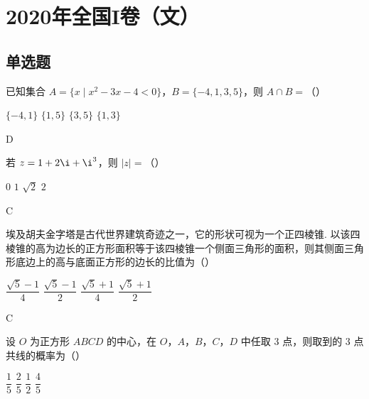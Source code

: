 \chapter{2020年全国I卷（文）}

\section{单选题}

\begin{problem}
已知集合 \(A=\{x\mid x^2-3x-4<0\}\)，\(B=\{-4,1,3,5\}\)，则 \(A\cap B=\)（\quad）

\choices
    {\(\{-4,1\}\)}
    {\(\{1,5\}\)}
    {\(\{3,5\}\)}
    {\(\{1,3\}\)}
\end{problem}

\begin{answer}
D
\end{answer}

\begin{problem}
若 \(z=1+2\i+\i^3\)，则 \(\lvert z\rvert=\)（\quad）

\choices
    {\(0\)}
    {\(1\)}
    {\(\sqrt{2}\)}
    {\(2\)}
\end{problem}

\begin{answer}
C
\end{answer}

\begin{problem}
埃及胡夫金字塔是古代世界建筑奇迹之一，它的形状可视为一个正四棱锥. 以该四棱锥的高为边长的正方形面积等于该四棱锥一个侧面三角形的面积，则其侧面三角形底边上的高与底面正方形的边长的比值为（\quad）


\choices
    {\(\dfrac{\sqrt{5}-1}{4}\)}
    {\(\dfrac{\sqrt{5}-1}{2}\)}
    {\(\dfrac{\sqrt{5}+1}{4}\)}
    {\(\dfrac{\sqrt{5}+1}{2}\)}
\end{problem}

\begin{answer}
C
\end{answer}

\begin{problem}
设 \(O\) 为正方形 \(ABCD\) 的中心，在 \(O\)，\(A\)，\(B\)，\(C\)，\(D\) 中任取 \(3\) 点，则取到的 \(3\) 点共线的概率为（\quad）

\choices
    {\(\dfrac{1}{5}\)}
    {\(\dfrac{2}{5}\)}
    {\(\dfrac{1}{2}\)}
    {\(\dfrac{4}{5}\)}
\end{problem}

